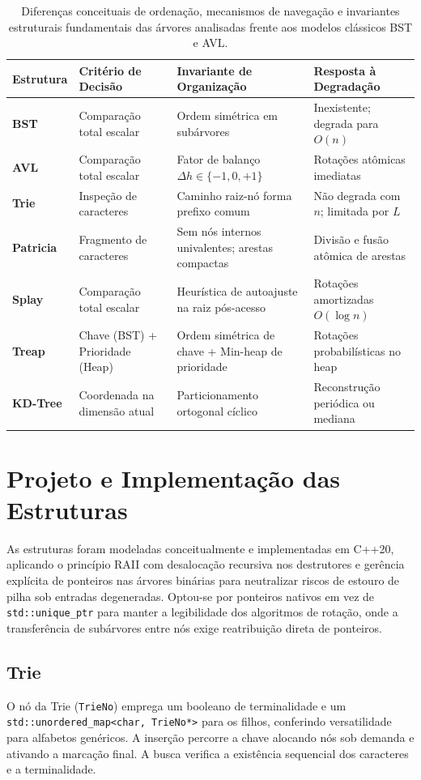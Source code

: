 \documentclass[11pt,a4paper]{article}
\newcommand{\Ogrande}[1]{\ensuremath{O\!\left(#1\right)}}
\begin{document}
\begin{table}[htbp]
\centering
\caption{Diferenças conceituais de ordenação, mecanismos de navegação e invariantes estruturais fundamentais das árvores analisadas frente aos modelos clássicos BST e AVL.}
\label{tab:conceitos}
\scriptsize
\begin{tabularx}{\linewidth}{>{\bfseries}l p{3.2cm} p{3.6cm} X}
\toprule
Estrutura & Critério de Decisão & Invariante de Organização & Resposta à Degradação \\
\midrule
BST & Comparação total escalar & Ordem simétrica em subárvores & Inexistente; degrada para $\Ogrande{n}$ \\
AVL & Comparação total escalar & Fator de balanço $\Delta h \in \{-1,0,+1\}$ & Rotações atômicas imediatas \\
Trie & Inspeção de caracteres & Caminho raiz-nó forma prefixo comum & Não degrada com $n$; limitada por $L$ \\
Patricia & Fragmento de caracteres & Sem nós internos univalentes; arestas compactas & Divisão e fusão atômica de arestas \\
Splay & Comparação total escalar & Heurística de autoajuste na raiz pós-acesso & Rotações amortizadas $\Ogrande{\log n}$ \\
Treap & Chave (BST) + Prioridade (Heap) & Ordem simétrica de chave + Min-heap de prioridade & Rotações probabilísticas no heap \\
KD-Tree & Coordenada na dimensão atual & Particionamento ortogonal cíclico & Reconstrução periódica ou mediana \\
\bottomrule
\end{tabularx}
\end{table}

\section{Projeto e Implementação das Estruturas}

As estruturas foram modeladas conceitualmente e implementadas em C++20, aplicando o princípio RAII com desalocação recursiva nos destrutores e gerência explícita de ponteiros nas árvores binárias para neutralizar riscos de estouro de pilha sob entradas degeneradas. Optou-se por ponteiros nativos em vez de \texttt{std::unique\_ptr} para manter a legibilidade dos algoritmos de rotação, onde a transferência de subárvores entre nós exige reatribuição direta de ponteiros.

\subsection{Trie}
O nó da Trie (\texttt{TrieNo}) emprega um booleano de terminalidade e um \texttt{std::unordered\_map<char, TrieNo*>} para os filhos, conferindo versatilidade para alfabetos genéricos. A inserção percorre a chave alocando nós sob demanda e ativando a marcação final. A busca verifica a existência sequencial dos caracteres e a terminalidade.
\end{document}
